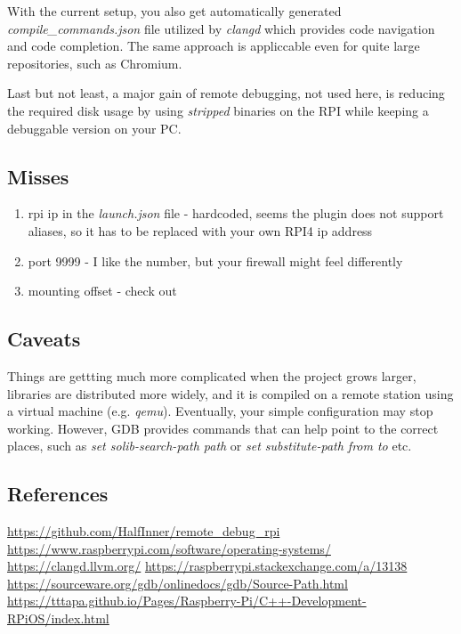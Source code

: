 \documentclass[twocolumn, 10pt]{article}
\makeatletter
\newcommand{\textFontName}{\f@family}
\makeatother
\begin{document}
With the current setup, you also get automatically generated \textit
  {compile\_commands.json} file utilized by \textit{clangd}
  \cite{bib:clangd} which provides code navigation and code completion.
  The same approach is appliccable even for quite large repositories,
  such as Chromium.

Last but not least, a major gain of remote debugging, not used here, is reducing
  the required disk usage by using \textit{stripped} binaries on the RPI while keeping a debuggable version on your PC.

\subsection*{Misses}
\begin{enumerate}
  \item rpi ip in the \textit{launch.json} file - hardcoded, seems the plugin does not support aliases,
        so it has to be replaced with your own RPI4 ip address
  \item port 9999 - I like the number, but your firewall might feel differently
  \item mounting offset - check \cite{bib:mounting-approach} out
\end{enumerate}

\subsection*{Caveats}
Things are gettting much more complicated when the project grows larger,
  libraries are distributed more widely, and it is compiled on a remote
  station using a virtual machine (e.g. \textit{qemu}). Eventually,
  your simple configuration may stop working. However,
  GDB provides commands that can help point to the correct places,
  such as \textit{set solib-search-path path} or
  \textit{set substitute-path from to} etc.\cite{bib:gdb-additional-configs}

\subsection*{References}
\begin{enumerate}[label={[\arabic*]}]
  \footnotesize
   \url{https://github.com/HalfInner/remote_debug_rpi}
   \url{https://www.raspberrypi.com/software/operating-systems/}
   \url{https://clangd.llvm.org/}
   \url{https://raspberrypi.stackexchange.com/a/13138}
   \url{https://sourceware.org/gdb/onlinedocs/gdb/Source-Path.html}
   \url{https://tttapa.github.io/Pages/Raspberry-Pi/C++-Development-RPiOS/index.html}
\end{enumerate}

\end{document}
